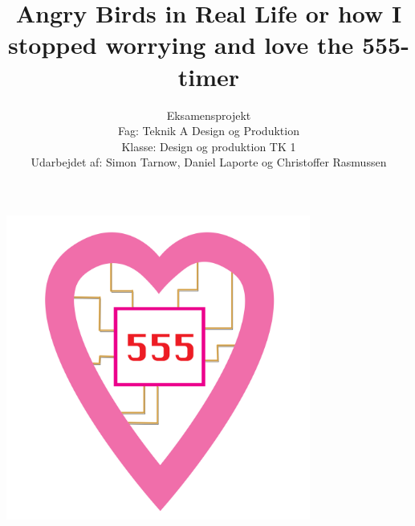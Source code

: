 \title{Angry Birds in Real Life or how I stopped worrying and love the 555-timer}
\author{Eksamensprojekt  \\ Fag: Teknik A Design og Produktion \\ Klasse: Design og produktion TK 1 \\ Udarbejdet af: Simon Tarnow, Daniel Laporte og Christoffer Rasmussen}
\maketitle
\begin{center}
 	\includegraphics[height=10cm]{figures/titlepicheart.png}
 \end{center}
 \newpage 
\tableofcontents
\newpage






